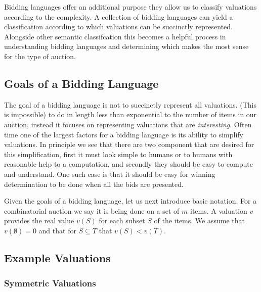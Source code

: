 \documentclass{article}
\begin{document}
Bidding languages offer an additional purpose they allow us to classify valuations according to the complexity. A collection of bidding languages can yield a classification according to which valuations can be succinctly represented. Alongside other semantic classifcation this becomes a helpful process in understanding bidding languages and determining which makes the most sense for the type of auction. 

\subsection{Goals of a Bidding Language}

The goal of a bidding language is not to succinctly represent all valuations. (This is impossible) to do in length less than exponential to the number of items in our auction, instead it focuses on representing valuations that are \emph{interesting}.  
Often time one of the largest factors for a bidding language is its ability to simplify valuations. In principle we see that there are two component that are desired for this simplification, first it must look simple to humans or to humans with reasonable help to a computation, and secondly they should be easy to compute and understand. One such case is that it should be easy for winning determination to be done when all the bids are presented.

Given the goals of a bidding language, let us next introduce basic notation. For a combinatorial auction we say it is being done on a set of \( m\) items. A valuation \( v\) provides the real value \(v(S)\) for each subset \(S\) of the items. We assume that \(v(\emptyset) = 0\) and that for \(S \subseteq T\) that \(v(S) < v(T)\).  

\subsection{Example Valuations}

\subsubsection{Symmetric Valuations}
\end{document}
